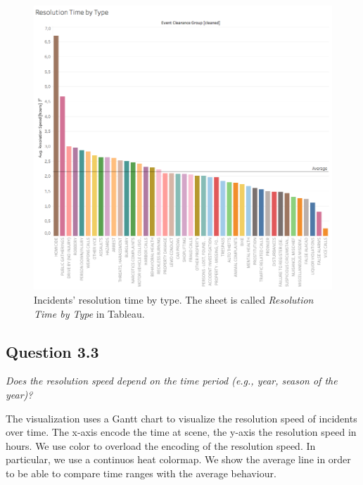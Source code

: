\begin{figure}[h]
	\centering
	\includegraphics[width=\columnwidth]{figures/3_2_resolution_speed_by_type}
	\caption{Incidents' resolution time by type. The sheet is called \textit{Resolution Time by Type} in Tableau.}
	\label{fig:3_2_resolution_speed_by_type}
\end{figure}


\subsection*{Question 3.3}
\textit{Does the resolution speed depend on the time period (e.g., year, season of the year)?}

The visualization uses a Gantt chart to visualize the resolution speed of incidents over time.
The x-axis encode the time at scene, the y-axis the resolution speed in hours.
We use color to overload the encoding of the resolution speed.
In particular, we use a continuos heat colormap.
We show the average line in order to be able to compare time ranges with the average behaviour.

